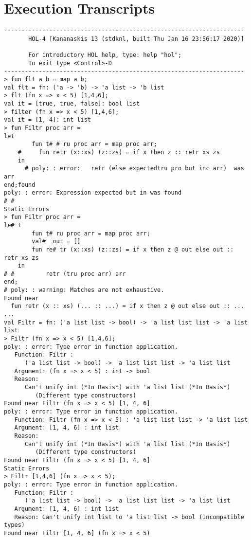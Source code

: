\documentclass[twoside]{report}
\begin{document}
\section{Execution Transcripts}
\begin{scriptsize}
    \begin{verbatim}
---------------------------------------------------------------------
       HOL-4 [Kananaskis 13 (stdknl, built Thu Jan 16 23:56:17 2020)]

       For introductory HOL help, type: help "hol";
       To exit type <Control>-D
---------------------------------------------------------------------
> fun flt a b = map a b;
val flt = fn: ('a -> 'b) -> 'a list -> 'b list
> flt (fn x => x < 5) [1,4,6];
val it = [true, true, false]: bool list
> filter (fn x => x < 5) [1,4,6];
val it = [1, 4]: int list
> fun Filtr proc arr =
let
        fun t# # ru proc arr = map proc arr;
    #     fun retr (x::xs) (z::zs) = if x then z :: retr xs zs
    in
      # poly: : error:   retr (else expectedtru pro but inc arr)  was arr
end;found
poly: : error: Expression expected but in was found
# #
Static Errors
> fun Filtr proc arr =
le# t
        fun t# ru proc arr = map proc arr;
        val#  out = []
        fun re# tr (x::xs) (z::zs) = if x then z @ out else out :: retr xs zs
    in
# #         retr (tru proc arr) arr
end;
# poly: : warning: Matches are not exhaustive.
Found near
  fun retr (x :: xs) (... :: ...) = if x then z @ out else out :: ... ...
val Filtr = fn: ('a list list -> bool) -> 'a list list list -> 'a list list
> Filtr (fn x => x < 5) [1,4,6];
poly: : error: Type error in function application.
   Function: Filtr :
      ('a list list -> bool) -> 'a list list list -> 'a list list
   Argument: (fn x => x < 5) : int -> bool
   Reason:
      Can't unify int (*In Basis*) with 'a list list (*In Basis*)
         (Different type constructors)
Found near Filtr (fn x => x < 5) [1, 4, 6]
poly: : error: Type error in function application.
   Function: Filtr (fn x => x < 5) : 'a list list list -> 'a list list
   Argument: [1, 4, 6] : int list
   Reason:
      Can't unify int (*In Basis*) with 'a list list (*In Basis*)
         (Different type constructors)
Found near Filtr (fn x => x < 5) [1, 4, 6]
Static Errors
> Filtr [1,4,6] (fn x => x < 5);
poly: : error: Type error in function application.
   Function: Filtr :
      ('a list list -> bool) -> 'a list list list -> 'a list list
   Argument: [1, 4, 6] : int list
   Reason: Can't unify int list to 'a list list -> bool (Incompatible types)
Found near Filtr [1, 4, 6] (fn x => x < 5)

\end{verbatim}
\end{scriptsize}
\end{document}
